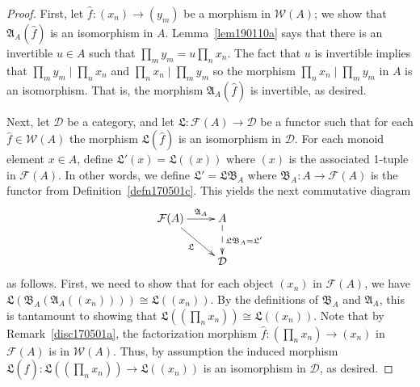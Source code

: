 \documentclass[reqno]{amsart}
\theoremstyle{plain}
\theoremstyle{definition}
\newcommand{\cat}[1]{\mathcal{#1}}
\newcommand{\catw}{\cat{W}}
\newcommand{\catf}{\cat{F}}
\newcommand{\catd}{\cat{D}}
\numberwithin{equation}{lem}
\begin{document}
\begin{proof}
First, let $\hat f\colon (x_n)\to(y_m)$ be a morphism in $\catw(A)$; we show that $\mathfrak A_A(\hat f)$ is an isomorphism in $A$.
Lemma~\ref{lem190110a} says that there is an invertible $u\in A$ such that 
$\prod_my_m=u\prod_nx_n$. The fact that $u$ is invertible implies that $\prod_my_m\mid\prod_nx_n$ and $\prod_nx_n\mid\prod_my_m$
so the morphism $\prod_nx_n\mid\prod_my_m$ in $A$ is an isomorphism. That is,
the morphism $\mathfrak A_A(\hat f)$ is invertible, as desired.

Next, let 
$\catd$ be a category, and let $\mathfrak L\colon 
\catf(A)
\to\catd$ be a functor
such that for each $\hat f\in\catw(A)$ the morphism $\mathfrak L(\hat f)$ is an isomorphism in $\catd$.
For each monoid element $x\in A$, define $\mathfrak L'(x)=\mathfrak L((x))$ where $(x)$ is the associated 1-tuple in $\catf(A)$. 
In other words, we define $\mathfrak L'=\mathfrak L\mathfrak B_A$ where $\mathfrak B_A\colon A\to\catf(A)$ 
is the functor from Definition~\ref{defn170501c}.
This yields the next commutative diagram
\begin{equation}\label{eq170501b}
\begin{split}
\xymatrix{
\catf(A)\ar[r]^-{\mathfrak A_A}\ar[rd]_{\mathfrak L}
&A\ar@{-->}[d]^{\mathfrak L\mathfrak B_A=\mathfrak L'}
\\
&\catd}
\end{split}
\end{equation}
as follows. 
First, we need to show that 
for each object $(x_n)$ in $\catf(A)$, we have $\mathfrak L(\mathfrak B_A(\mathfrak A_A((x_n))))\cong\mathfrak L((x_n))$.
By the definitions of $\mathfrak B_A$ and $\mathfrak A_A$, this is tantamount to showing that $\mathfrak L((\prod_nx_n))\cong\mathfrak L((x_n))$.
Note that by 
Remark~\ref{disc170501a}, the factorization
morphism $\hat f\colon (\prod_nx_n)\to(x_n)$ in $\catf(A)$ is in $\catw(A)$. 
Thus, by assumption the 
induced morphism $\mathfrak L(\hat f)\colon \mathfrak L((\prod_nx_n))\to\mathfrak L((x_n))$ is an isomorphism in $\catd$, as desired.


\end{proof}
\end{document}
